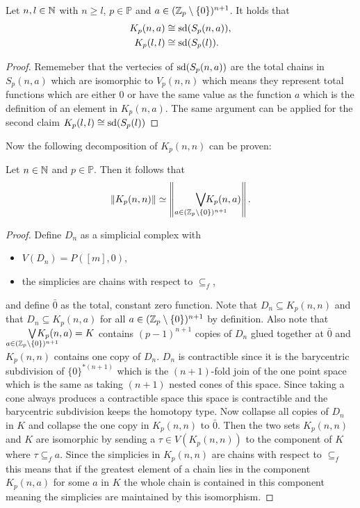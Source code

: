 \begin{rem}\label{rem:kcongs}
  Let $n,l\in\mathbb{N}$ with $n \geq l$, $p\in\mathbb{P}$ and $a\in (\mathbb{Z}_p\setminus\{0\})^{n+1}$. It holds that
  \begin{align*}
    K_p(n,a) &\cong {\rm sd}(S_p(n,a)), \\
    K_p(l,l) &\cong {\rm sd}(S_p(l)).
  \end{align*}
\end{rem}

\begin{proof}
  Rememeber that the vertecies of ${\rm sd}(S_p(n,a))$ are the total chains in $S_p(n,a)$ which are isomorphic to $V_p(n,n)$ which means they represent total functions which are either 0 or have the same value as the function $a$ which is the definition of an element in $K_p(n,a)$. The same argument can be applied for the second claim $K_p(l,l) \cong {\rm sd}(S_p(l))$
\end{proof}

Now the following decomposition of $K_p(n,n)$ can be proven:
\begin{lemma}\label{lem:kpka}
  Let $n\in\mathbb{N}$ and $p\in\mathbb{P}$. Then it follows that
  \begin{equation*}
    \left\lVert K_p(n,n) \right\rVert \simeq \left\lVert \bigvee_{a\in(\Z_p\setminus\{0\})^{n+1}}\hspace*{-24px}K_p(n,a)\right\rVert.
  \end{equation*}
\end{lemma}
\begin{proof}
  Define $D_n$ as a simplicial complex with
  \begin{itemize}
    \item $V(D_n) = P([m], 0)$,
    \item the simplicies are chains with respect to $\subseteq_f$,
  \end{itemize}
  and define $\bar{0}$ as the total, constant zero function. Note that $D_n \subseteq K_p(n,n)$ and that $D_n \subseteq K_p(n,a)$ for all $a \in (\mathbb{Z}_p\setminus \{0\})^{n+1}$ by definition.
  Also note that $\bigvee\limits_{a\in(\Z_p\setminus\{0\})^{n+1}}\hspace*{-24px}K_p(n,a) = K$ contains $(p-1)^{n+1}$ copies of $D_n$ glued together at $\bar{0}$ and $K_p(n,n)$ contains one copy of $D_n$. $D_n$ is contractible since it is the barycentric subdivision of $\{0\}^{*(n+1)}$ which is the $(n+1)$-fold join of the one point space which is the same as taking $(n+1)$ nested cones of this space. Since taking a cone always produces a contractible space this space is contractible and the barycentric subdivision keeps the homotopy type. Now collapse all copies of $D_n$ in $K$ and collapse the one copy in $K_p(n,n)$ to $\bar{0}$. Then the two sets $K_p(n,n)$ and $K$ are isomorphic by sending a $\tau \in V(K_p(n,n))$ to the component of $K$ where $\tau \subseteq_f a$. Since the simplicies  in $K_p(n,n)$ are chains with respect to $\subseteq_f$ this means that if the greatest element of a chain lies in the component $K_p(n,a)$ for some $a$ in $K$ the whole chain is contained in this component meaning the simplicies are maintained by this isomorphism. 
\end{proof}


